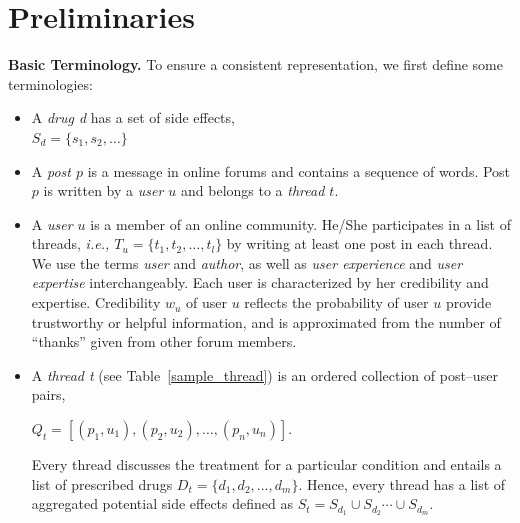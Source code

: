 \documentclass{bmcart}
\begin{document}
\section{Preliminaries}

{\bf Basic Terminology.} To ensure a consistent representation, 
we first define some terminologies: 

\begin{itemize}
\item A \textit{drug d} has a set of side effects, \\
  $S_d = \{s_1, s_2, \ldots\}$
\item A \textit{post $p$} is a message in online forums and contains a sequence of words. Post $p$ is written by a \textit{user $u$} and belongs to a \textit{thread $t$}.
\item A \textit{user $u$} is a member of an online community. He/She participates in a list of threads, \textit{ i.e., $T_u = \{t_1, t_2, \ldots, t_l\}$} by writing at least one post in each thread.
We use the terms \textit{user} and \textit{author}, as well as \textit{user experience} and \textit{user expertise} interchangeably.
\noindent
Each user is characterized by her credibility and expertise. Credibility $w_u$ of user $u$ reflects the probability of user $u$ provide trustworthy or helpful information, and is approximated from the number of ``thanks'' given from other forum members.

\item A \textit{thread t} %
(see Table~\ref{sample_thread}) 
is an ordered collection of post--user pairs, 

$Q_t = [\left(p_1, u_1\right), \left(p_2, u_2\right), \ldots, \left(p_n, u_n\right)]$. 

\noindent
Every thread discusses the treatment for a particular condition and entails a list of prescribed drugs 
$D_t=\{d_1, d_2, \ldots, d_m\}$. 
Hence, every thread has a list of aggregated potential side effects defined as $S_t = S_{d_1} \cup S_{d_2} \cdots \cup S_{d_m}$. \\

\end{itemize}
\end{document}
